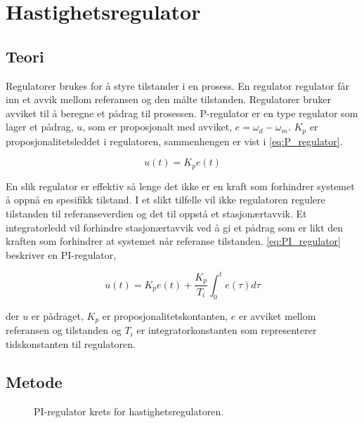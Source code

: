 \section{Hastighetsregulator}\label{sec:hastighetsreg}

\subsection{Teori}

Regulatorer brukes for å styre tilstander i en prosess. En regulator regulator får inn et avvik mellom referansen og den målte tilstanden. Regulatorer bruker avviket til å beregne et pådrag til prosessen. P-regulator er en type regulator som lager et pådrag, $u$,  som er proposjonalt med avviket, $e = \omega_d - \omega_m$. $K_p$ er proposjonalitetsleddet i regulatoren, sammenhengen er vist i \autoref{eq:P_regulator}.

\begin{equation}
    \label{eq:P_regulator}
    u(t) = K_p e(t)
\end{equation}

En slik regulator er effektiv så lenge det ikke er en kraft som forhindrer systemet å oppnå en spesifikk tilstand. I et slikt tilfelle vil ikke regulatoren regulere tilstanden til referanseverdien og det til oppstå et stasjonærtavvik. Et integratorledd vil forhindre stasjonærtavvik ved å gi et pådrag som er likt den kraften som forhindrer at systemet når referanse tilstanden. \autoref{eq:PI_regulator} beskriver en PI-regulator,

\begin{equation}
    \label{eq:PI_regulator}
    u(t) = K_p e(t) + \frac{K_p}{T_i} \int_{0}^{t} e(\tau) d\tau
\end{equation}

der $u$ er pådraget, $K_p$ er proposjonalitetskontanten, $e$ er avviket mellom referansen og tilstanden og $T_i$ er integratorkonstanten som representerer tidskonstanten til regulatoren.

\subsection{Metode}

\begin{figure}[b]
    \centering
    
    \caption{PI-regulator krets for hastighetsregulatoren.}
    \label{fig:krets_hastighets_regulator}
\end{figure}

